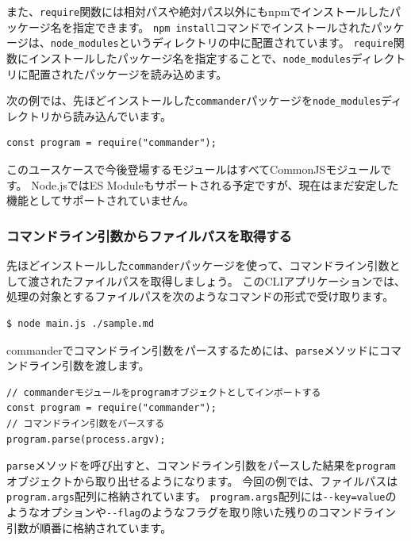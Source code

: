 また、\texttt{require}関数には相対パスや絶対パス以外にもnpmでインストールしたパッケージ名を指定できます。
\texttt{npm install}コマンドでインストールされたパッケージは、\texttt{node\_modules}というディレクトリの中に配置されています。
\texttt{require}関数にインストールしたパッケージ名を指定することで、\texttt{node\_modules}ディレクトリに配置されたパッケージを読み込めます。

次の例では、先ほどインストールした\texttt{commander}パッケージを\texttt{node\_modules}ディレクトリから読み込んでいます。

\begin{lstlisting}
const program = require("commander");
\end{lstlisting}

このユースケースで今後登場するモジュールはすべてCommonJSモジュールです。
Node.jsではES
Moduleもサポートされる予定ですが、現在はまだ安定した機能としてサポートされていません。

\hypertarget{get-file-path}{%
\subsubsection{コマンドライン引数からファイルパスを取得する}\label{get-file-path}}

先ほどインストールした\texttt{commander}パッケージを使って、コマンドライン引数として渡されたファイルパスを取得しましょう。
このCLIアプリケーションでは、処理の対象とするファイルパスを次のようなコマンドの形式で受け取ります。

\begin{lstlisting}
$ node main.js ./sample.md
\end{lstlisting}

commanderでコマンドライン引数をパースするためには、\texttt{parse}メソッドにコマンドライン引数を渡します。

\begin{lstlisting}
// commanderモジュールをprogramオブジェクトとしてインポートする
const program = require("commander");
// コマンドライン引数をパースする
program.parse(process.argv);
\end{lstlisting}

\texttt{parse}メソッドを呼び出すと、コマンドライン引数をパースした結果を\texttt{program}オブジェクトから取り出せるようになります。
今回の例では、ファイルパスは\texttt{program.args}配列に格納されています。
\texttt{program.args}配列には\texttt{-\/-key=value}のようなオプションや\texttt{-\/-flag}のようなフラグを取り除いた残りのコマンドライン引数が順番に格納されています。


